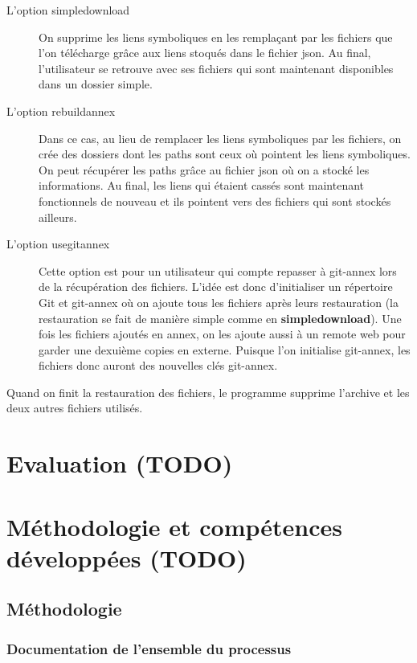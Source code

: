 \documentclass[11pt]{article}
\begin{document}
\begin{description}
\item[{L'option simpledownload}] On supprime les liens symboliques en les remplaçant par les fichiers
que l'on télécharge grâce aux liens stoqués dans le fichier json. Au
final, l'utilisateur se retrouve avec ses fichiers qui sont
maintenant disponibles dans un dossier simple.

\item[{L'option rebuildannex}] Dans ce cas, au lieu de remplacer les liens symboliques par les
fichiers, on crée des dossiers dont les paths sont ceux où pointent
les liens symboliques. On peut récupérer les paths grâce au fichier
json où on a stocké les informations.
Au final, les liens qui étaient cassés sont maintenant fonctionnels
de nouveau et ils pointent vers des fichiers qui sont stockés ailleurs.

\item[{L'option usegitannex}] Cette option est pour un utilisateur qui compte repasser à git-annex
lors de la récupération des fichiers. L'idée est donc d'initialiser
un répertoire Git et git-annex où on ajoute tous les fichiers après
leurs restauration (la restauration se fait de manière simple comme
en \textbf{simpledownload}). Une fois les fichiers ajoutés en annex, on les
ajoute aussi à un remote web pour garder une dexuième copies en
externe.
Puisque l'on initialise git-annex, les fichiers donc auront des
nouvelles clés git-annex.
\end{description}

Quand on finit la restauration des fichiers, le programme supprime
l'archive et les deux autres fichiers utilisés.

\section{Evaluation (TODO)}
\label{sec:orgfbc1868}
\section{Méthodologie et compétences développées (TODO)}
\label{sec:orge4c88b8}
\subsection{Méthodologie}
\label{sec:orgefbe701}
\subsubsection{Documentation de l'ensemble du processus}
\label{sec:org8b825b0}
\end{document}
